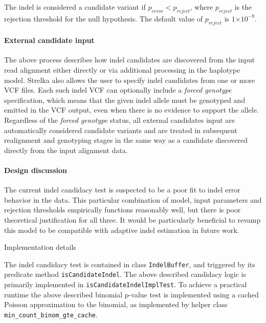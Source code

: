 \documentclass{article}
\let\IncludeDevelopmentDetail
\newenvironment{raggedParagraph}[1]
{
    \begin{paragraph} {#1}
        \raggedright
    }
    {
    \end{paragraph}
}
\newcommand{\e}[1]{\ensuremath{\times 10^{#1}}}
\begin{document}
\noindent The indel is considered a candidate variant if $p_{error} < p_{reject}$, where $p_{reject}$ is the rejection threshold for the null hypothesis. The default value of $p_{reject}$ is $1\e{-9}$.

\paragraph{External candidate input}

The above process describes how indel candidates are discovered from the input read alignment either directly or via additional processing in the haplotype model. Strelka also allows the user to specify indel candidates from one or more VCF files. Each such indel VCF can optionally include a \emph{forced genotype} specification, which means that the given indel allele must be genotyped and emitted in the VCF output, even when there is no evidence to support the allele. Regardless of the \emph{forced genotype} status, all external candidates input are automatically considered candidate variants and are treated in subsequent realignment and genotyping stages in the same way as a candidate discovered directly from the input alignment data.

\ifx\IncludeDevelopmentDetail

\paragraph{Design discussion}

The current indel candidacy test is suspected to be a poor fit to indel error behavior in the data. This particular combination of model, input parameters and rejection thresholds empirically functions reasonably well, but there is poor theoretical justification for all three. It would be particularly beneficial to revamp this model to be compatible with adaptive indel estimation in future work.


\begin{raggedParagraph}{Implementation details}

The indel candidacy test is contained in class \verb|IndelBuffer|, and triggered by its predicate method \verb|isCandidateIndel|. The above described candidacy logic is primarily implemented in \verb|isCandidateIndelImplTest|. To achieve a practical runtime the above described binomial p-value test is implemented using a cached Poisson approximation to the binomial, as implemented by helper class \verb|min_count_binom_gte_cache|.

\end{raggedParagraph}
\end{document}
